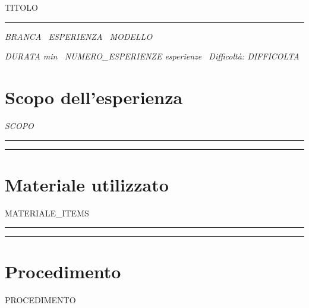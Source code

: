 \documentclass[11pt,a4paper]{article}
\newcommand{\ornamento}{%
  \begin{center}
    \color{accent}\rule{0.32\linewidth}{0.4pt}\quad\textasteriskcentered\quad\rule{0.32\linewidth}{0.4pt}
  \end{center}
}
\begin{document}
\begin{center}
  {\Huge\scshape\color{accentstrong} {{TITOLO}}\par}
  \vspace{4pt}
  \color{accent}\rule{0.5\linewidth}{0.6pt}\par
  \vspace{6pt}
  {\small\itshape\color{inksoft}
    {{BRANCA}} \textperiodcentered\ {{ESPERIENZA}} \textperiodcentered\ {{MODELLO}}\par
  }
  {\small\itshape\color{inksoft}
    {{DURATA}} min \textperiodcentered\ {{NUMERO_ESPERIENZE}} esperienze
    \textperiodcentered\ Difficoltà: {{DIFFICOLTA}}\par
  }
\end{center}

\vspace{10pt}

\section*{Scopo dell'esperienza}
{\itshape {{SCOPO}}\par}

\ornamento

\section*{Materiale utilizzato}
\begin{itemize}
{{MATERIALE_ITEMS}}
\end{itemize}

\ornamento

\section*{Procedimento}
{{PROCEDIMENTO}}
\end{document}
